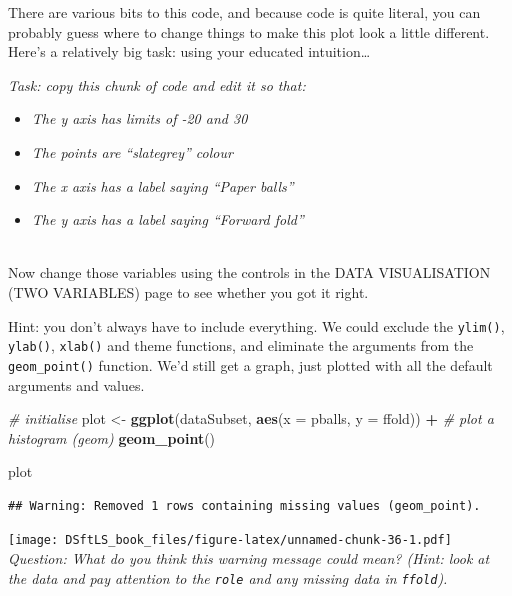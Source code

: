 \documentclass[
]{book}
\newenvironment{Shaded}{\begin{snugshade}}{\end{snugshade}}
\newcommand{\CommentTok}[1]{\textcolor[rgb]{0.56,0.35,0.01}{\textit{#1}}}
\newcommand{\DataTypeTok}[1]{\textcolor[rgb]{0.13,0.29,0.53}{#1}}
\newcommand{\KeywordTok}[1]{\textcolor[rgb]{0.13,0.29,0.53}{\textbf{#1}}}
\newcommand{\NormalTok}[1]{#1}
\newcommand{\OperatorTok}[1]{\textcolor[rgb]{0.81,0.36,0.00}{\textbf{#1}}}
\newcommand{\StringTok}[1]{\textcolor[rgb]{0.31,0.60,0.02}{#1}}
\providecommand{\tightlist}{%
  \setlength{\itemsep}{0pt}\setlength{\parskip}{0pt}}
\begin{document}
There are various bits to this code, and because code is quite literal, you can
probably guess where to change things to make this plot look a little different.
Here's a relatively big task: using your educated intuition\ldots{}

\emph{Task: copy this chunk of code and edit it so that:}

\begin{itemize}
\tightlist
\item
  \emph{The y axis has limits of -20 and 30}
\item
  \emph{The points are ``slategrey'' colour}
\item
  \emph{The x axis has a label saying ``Paper balls''}
\item
  \emph{The y axis has a label saying ``Forward fold''}\\
  ~\\
\end{itemize}

Now change those variables using the controls in the DATA VISUALISATION
(TWO VARIABLES) page to see whether you got it right.

Hint: you don't always have to include everything. We could exclude the
\texttt{ylim()}, \texttt{ylab()}, \texttt{xlab()} and theme functions, and eliminate the arguments
from the \texttt{geom\_point()} function. We'd still get a graph, just plotted with all the
default arguments and values.

\begin{Shaded}
\begin{Highlighting}[]
\CommentTok{# initialise}
\NormalTok{plot <-}\StringTok{ }\KeywordTok{ggplot}\NormalTok{(dataSubset, }\KeywordTok{aes}\NormalTok{(}\DataTypeTok{x =}\NormalTok{ pballs, }\DataTypeTok{y =}\NormalTok{ ffold)) }\OperatorTok{+}
\StringTok{    }\CommentTok{# plot a histogram (geom)}
\StringTok{    }\KeywordTok{geom_point}\NormalTok{()}

\NormalTok{plot}
\end{Highlighting}
\end{Shaded}

\begin{verbatim}
## Warning: Removed 1 rows containing missing values (geom_point).
\end{verbatim}

\texttt{[image: DSftLS\_book\_files/figure-latex/unnamed-chunk-36-1.pdf]}\\

\emph{Question: What do you think this warning message could mean? (Hint: look
at the data and pay attention to the \texttt{role} and any missing data in \texttt{ffold}).}\\
~\\
\end{document}
